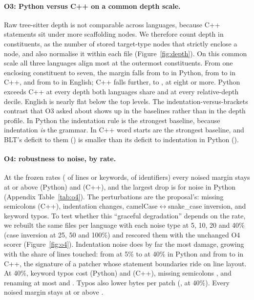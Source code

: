 \paragraph{O3: Python versus C++ on a common depth scale.} Raw tree-sitter depth is not comparable across languages, because C++ statements sit under more scaffolding nodes. We therefore count depth in constituents, as the number of stored target-type nodes that strictly enclose a node, and also normalise it within each file (Figure~\ref{fig:depth}). On this common scale all three languages align most at the outermost constituents. From one enclosing constituent to seven, the margin falls from \xDepthOnePy{} to \xDepthSevenPy{} in Python, from \xDepthOneCpp{} to \xDepthSevenCpp{} in C++, and from \xDepthOneEn{} to \xDepthSevenEn{} in English; C++ falls further, to \xDepthEightCpp{}, at eight or more. Python exceeds C++ at every depth both languages share and at every relative-depth decile. English is nearly flat below the top levels. The indentation-versus-brackets contrast that O3 asked about shows up in the baselines rather than in the depth profile. In Python the indentation rule is the strongest baseline, because indentation \emph{is} the grammar. In C++ word starts are the strongest baseline, and BLT's deficit to them (\VsBaseCpp{}) is smaller than its deficit to indentation in Python (\VsBasePy{}).

\paragraph{O4: robustness to noise, by rate.} At the frozen rates (\OFourRate{} of lines or keywords, \OFourCaseRate{} of identifiers) every noised margin stays at or above \OFourMinMarginPy{} (Python) and \OFourMinMarginCpp{} (C++), and the largest drop is \OFourWorstDmPy{} for \OFourWorstPy{} noise in Python (Appendix Table~\ref{tab:o4}). The perturbations are the proposal's: missing semicolons (C++), indentation changes, camelCase$\leftrightarrow$snake\_case inversion, and keyword typos. To test whether this ``graceful degradation'' depends on the rate, we rebuilt the same \xOFourSweepFiles{} files per language with each noise type at 5, 10, 20 and 40\% (case inversion at 25, 50 and 100\%) and rescored them with the unchanged O4 scorer (Figure~\ref{fig:o4}). Indentation noise does by far the most damage, growing with the share of lines touched: from \xOFourIndentLoPy{} at 5\% to \xOFourIndentHiPy{} at 40\% in Python and from \xOFourIndentLoCpp{} to \xOFourIndentHiCpp{} in C++, the signature of a patcher whose statement boundaries ride on line layout. At 40\%, keyword typos cost \xOFourTypoHiPy{} (Python) and \xOFourTypoHiCpp{} (C++), missing semicolons \xOFourSemiHiCpp{}, and renaming at most \xOFourCaseMaxPy{} and \xOFourCaseMaxCpp{}. Typos also lower bytes per patch (\xOFourTypoBppPy{}, \xOFourTypoBppCpp{} at 40\%). Every noised margin stays at or above \xOFourSweepMinMargin{}.

